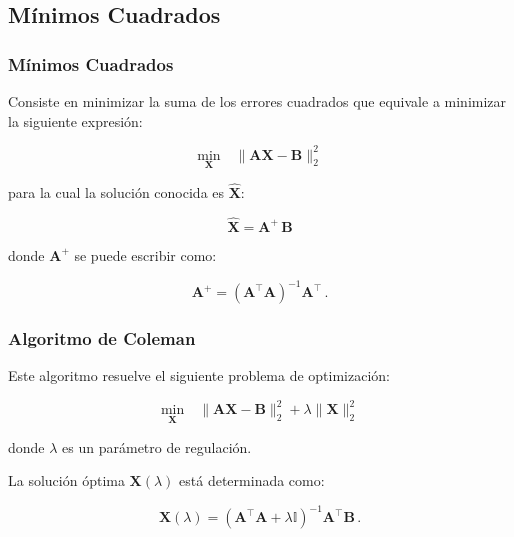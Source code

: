 \documentclass{beamer}
\begin{document}
        \subsection{Mínimos Cuadrados}
            \begin{frame}
            \frametitle{Mínimos Cuadrados}
            Consiste en minimizar la suma de los errores cuadrados que equivale
            a minimizar la siguiente expresión:
            
            \begin{equation}
            \label{eq:regressionproblem}
            \underset{\mathbf{X}}{\text{min}} \quad \| \mathbf{A}\mathbf{\mathbf{X}} - \mathbf{B} \|_2^2
            \end{equation}
            
            \noindent para la cual la solución conocida es $\hat{\mathbf{X}}$:
            
            \begin{equation}
            \label{eq:MP}
            \hat{\mathbf{X}}=\mathbf{A}^{\!\!+}\,\mathbf{B}
            \end{equation}
            
            \noindent donde $\mathbf{A}^{\!\!+}$ se puede escribir como:
            
            \begin{equation}
            \label{eq:pseudoinverse}
            \mathbf{A}^{\!\!+}= (\mathbf{A}^{\!\!\top} \mathbf{A})^{-1}\mathbf{A}^{\!\!\top} \, .
            \end{equation}

            \end{frame}
            \begin{frame}
            \frametitle{Algoritmo de Coleman}
            Este algoritmo resuelve el siguiente problema de optimización:
            
            \begin{equation}
            \label{eq:RRproblem}
            \underset{\mathbf{X}}{\text{min}} \quad \|
            \mathbf{A}\mathbf{\mathbf{X}} - \mathbf{B} \|_2^2 +\lambda \|
            \mathbf{\mathbf{X}}\|_2^2 
            \end{equation}
            
            \noindent donde $\lambda$ es un parámetro de regulación.
            
            La solución óptima $\mathbf{X}(\lambda)$ está determinada como:
            
            \begin{equation}
            \label{eq:optsolRR}
            \mathbf{X}(\lambda)=(\mathbf{A}^\top \mathbf{A}+ \lambda
            \mathbb{I})^{-1}\mathbf{A}^\top \mathbf{B} \, . 
            \end{equation}

            \end{frame}
\end{document}
